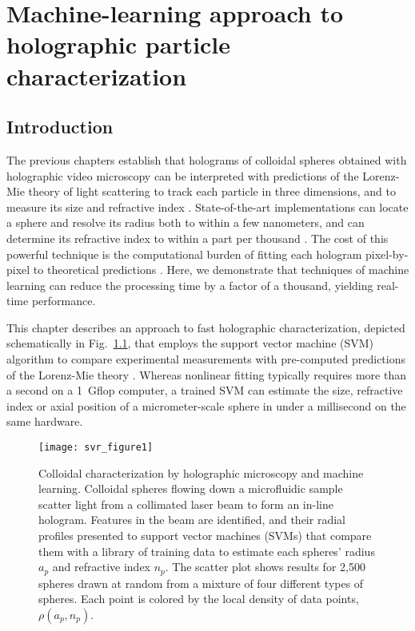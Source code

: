 \chapter{Machine-learning approach to holographic particle characterization}
\label{ch:svr}

\section{Introduction}

The previous chapters establish that holograms of colloidal spheres obtained 
with holographic video microscopy
\cite{sheng06,lee07}
can be interpreted with predictions of the Lorenz-Mie theory 
of light scattering \cite{bohren83}
to track each particle in three dimensions, and to measure 
its size and refractive index \cite{lee07a}.
State-of-the-art implementations \cite{lee07a,bourquard13,seifi13,fung13}
can locate a sphere and resolve its
radius both to within a few nanometers, and 
can determine its refractive index to within a part per thousand
\cite{cheong09,shpaisman12,krishnatreya14}.
The cost of this powerful technique is the computational burden of
fitting each hologram pixel-by-pixel to theoretical predictions
\cite{lee07a,cheong10a}.
Here, we demonstrate that techniques of machine learning
can reduce the processing time by a factor of a thousand,
yielding real-time performance.

This chapter describes an approach to fast holographic characterization,
depicted schematically in Fig.~\ref{fig:method}, that
employs the support vector machine (SVM) algorithm
\cite{smola04} 
to compare experimental measurements with
pre-computed predictions of the Lorenz-Mie theory
\cite{bohren83,lee07a,krishnatreya14a}.
Whereas nonlinear fitting typically requires more than a second
on a \SI{1}{\giga flop} computer,
a trained SVM can estimate the size, refractive index or
axial position of a micrometer-scale sphere
in under a millisecond on the same hardware.

\begin{figure}
  \centering
  \texttt{[image: svr\_figure1]}
  \caption{Colloidal characterization by holographic microscopy and
    machine learning.  Colloidal spheres flowing down a microfluidic
    sample scatter light from a collimated laser beam to form an
    in-line hologram.  Features in the beam are identified, and their
    radial profiles presented to support vector machines (SVMs)
    that compare them with a library of training data to estimate
    each spheres' radius $a_p$ and refractive index
    $n_p$.  The scatter plot shows results for 2,500 spheres
    drawn at random from a mixture of four different types of
    spheres.  Each point is colored by the local density of
    data points, $\rho(a_p,n_p)$.\cite{yevick14}}
  \label{fig:method}
\end{figure}

